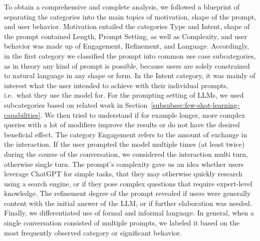 To obtain a comprehensive and complete analysis, we followed a blueprint of separating the
categories into the main topics of motivation, shape of the prompt, and user behavior.
Motivation entailed the categories Type and Intent, shape of the prompt contained Length, Prompt
Setting, as well as Complexity, and user behavior was made up of Engagement, Refinement, and
Language.
Accordingly, in the first category we classified the prompt into common use case
subcategories, as in theory any kind of prompt is possible, because users are solely constrained to natural language
in any shape or form.
In the Intent category, it was mainly of interest what the user intended to achieve with their
individual prompts,
i.e.\ what they use the model for.
For the prompting setting of LLMs, we used subcategories based on related work in
Section~\ref{subsubsec:few-shot-learning-capabilities}.
We then tried to understand if for example longer, more complex queries with a
lot of modifiers improve the results or do not have the desired beneficial effect.
The category Engagement refers to the amount of exchange in the interaction.
If the user prompted the model multiple times (at least twice) during the course of the
conversation, we considered the interaction multi turn, otherwise single turn.
The prompt's complexity gave us an idea whether users leverage ChatGPT for simple
tasks, that they may otherwise quickly research using a search engine, or if they pose complex
questions that require expert-level knowledge.
The refinement degree of the prompt revealed if users were generally content with the initial
answer of the LLM, or if further elaboration was needed.
Finally, we differentiated use of formal and informal language.
In general, when a single conversation consisted of multiple prompts, we labeled it based on the
most frequently observed category or significant behavior.

